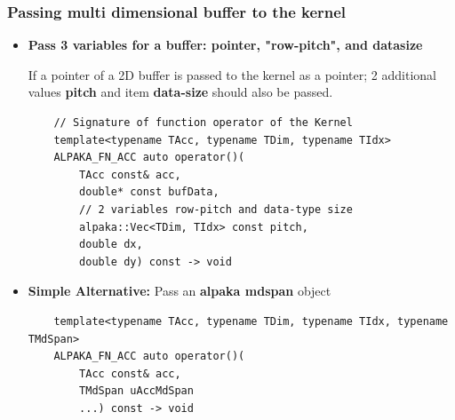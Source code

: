 \documentclass[9pt]{beamer}
\begin{document}
 %

\begin{frame}[fragile]
\small
\frametitle{Passing multi dimensional buffer to the kernel}
 \begin{itemize}
 \item \textbf{Pass 3 variables for a buffer: pointer,  "row-pitch", and datasize}

If a pointer of a 2D buffer is passed to the kernel as a pointer; 2 additional values \textbf{pitch} and item \textbf{data-size} should also be passed.

        \lstset{basicstyle=\ttfamily\scriptsize}
        \begin{lstlisting}
    // Signature of function operator of the Kernel
    template<typename TAcc, typename TDim, typename TIdx>
    ALPAKA_FN_ACC auto operator()(
        TAcc const& acc,
        double* const bufData,
        // 2 variables row-pitch and data-type size
        alpaka::Vec<TDim, TIdx> const pitch,
        double dx,
        double dy) const -> void
        \end{lstlisting}

        \hspace{-0.2\baselineskip}


\item \textbf{Simple Alternative:} Pass an \textbf{alpaka mdspan} object
\lstset{basicstyle=\ttfamily\scriptsize}
\begin{lstlisting}
    template<typename TAcc, typename TDim, typename TIdx, typename TMdSpan>
    ALPAKA_FN_ACC auto operator()(
        TAcc const& acc,
        TMdSpan uAccMdSpan
        ...) const -> void
\end{lstlisting}
\end{itemize}
\end{frame}
\end{document}
